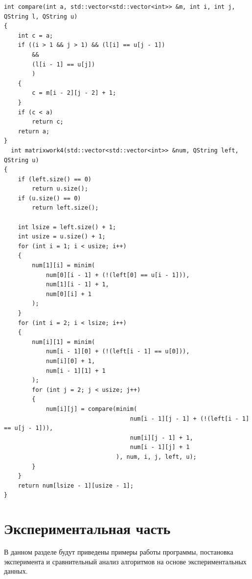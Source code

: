 \documentclass[a4paper, 14pt]{article}
\begin{document}
	\begin{lstlisting}[label=matrix-lev,caption=Матричная реализация алгорима Дамерау-Левенштейна]
	int compare(int a, std::vector<std::vector<int>> &m, int i, int j, QString l, QString u)
{
    int c = a;
    if ((i > 1 && j > 1) && (l[i] == u[j - 1])
        &&
        (l[i - 1] == u[j])
        )
    {
        c = m[i - 2][j - 2] + 1;
    }
    if (c < a)
        return c;
    return a;
}
  int matrixwork4(std::vector<std::vector<int>> &num, QString left, QString u)
{
    if (left.size() == 0)
        return u.size();
    if (u.size() == 0)
        return left.size();

    int lsize = left.size() + 1;
    int usize = u.size() + 1;
    for (int i = 1; i < usize; i++)
    {
        num[1][i] = minim(
            num[0][i - 1] + (!(left[0] == u[i - 1])),
            num[1][i - 1] + 1,
            num[0][i] + 1
        );
    }
    for (int i = 2; i < lsize; i++)
    {
        num[i][1] = minim(
            num[i - 1][0] + (!(left[i - 1] == u[0])),
            num[i][0] + 1,
            num[i - 1][1] + 1
        );
        for (int j = 2; j < usize; j++)
        {
            num[i][j] = compare(minim(
                                    num[i - 1][j - 1] + (!(left[i - 1] == u[j - 1])),
                                    num[i][j - 1] + 1,
                                    num[i - 1][j] + 1
                                ), num, i, j, left, u);
        }
    }
    return num[lsize - 1][usize - 1];
}
	\end{lstlisting}
	
	
	


    \newpage
  \newpage
	\section{Экспериментальная часть}
	В данном разделе будут приведены примеры работы программы, постановка эксперимента и сравнительный анализ алгоритмов на основе экспериментальных данных.
\end{document}
